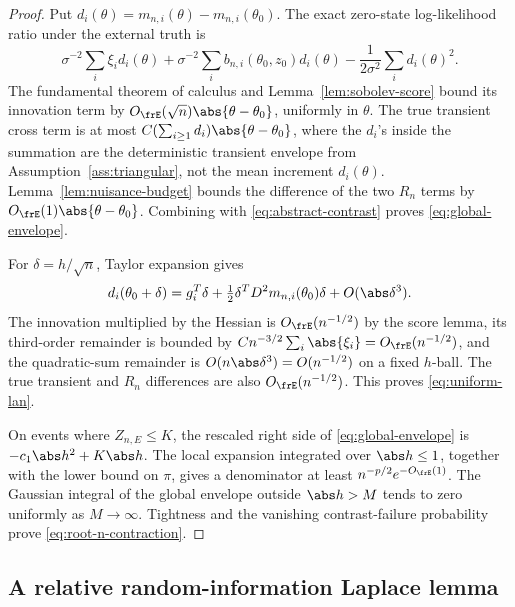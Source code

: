 \begin{proof}
Put \(d_i(\theta)=m_{n,i}(\theta)-m_{n,i}(\theta_0)\).  The exact zero-state
log-likelihood ratio under the external truth is
\begin{equation}
 \sigma^{-2}\sum_i\xi_i d_i(\theta)
 +\sigma^{-2}\sum_i b_{n,i}(\theta_0,z_0)d_i(\theta)
 -\frac1{2\sigma^2}\sum_i d_i(\theta)^2.
 \label{eq:exact-zero-state-ratio}
\end{equation}
The fundamental theorem of calculus and
Lemma~\ref{lem:sobolev-score} bound its innovation term by
\(O_{\frE}(\sqrt n)\abs{\theta-\theta_0}\), uniformly in \(\theta\).
The true transient cross term is at most
\(C(\sum_{i\ge1}d_i)\abs{\theta-\theta_0}\), where the \(d_i\)'s inside
the summation are the deterministic transient envelope from
Assumption~\ref{ass:triangular}, not the mean increment \(d_i(\theta)\).
Lemma~\ref{lem:nuisance-budget} bounds the difference of the two \(R_n\)
terms by \(O_{\frE}(1)\abs{\theta-\theta_0}\). Combining with
\eqref{eq:abstract-contrast} proves \eqref{eq:global-envelope}.

For \(\delta=h/\sqrt n\), Taylor expansion gives
\[
 d_i(\theta_0+\delta)=g_i^T\delta
 +\tfrac12\delta^TD^2m_{n,i}(\theta_0)\delta+O(\abs\delta^3).
\]
The innovation multiplied by the Hessian is \(O_{\frE}(n^{-1/2})\) by the
score lemma, its third-order remainder is bounded by
\(Cn^{-3/2}\sum_i\abs{\xi_i}=O_{\frE}(n^{-1/2})\), and the quadratic-sum
remainder is \(O(n\abs\delta^3)=O(n^{-1/2})\) on a fixed \(h\)-ball. The
true transient and \(R_n\) differences are also \(O_{\frE}(n^{-1/2})\).
This proves \eqref{eq:uniform-lan}.

On events where \(Z_{n,E}\le K\), the rescaled right side of
\eqref{eq:global-envelope} is \(-c_1\abs h^2+K\abs h\). The local expansion
integrated over \(\abs h\le1\), together with the lower bound on \(\pi\),
gives a denominator at least \(n^{-p/2}e^{-O_{\frE}(1)}\). The Gaussian
integral of the global envelope outside \(\abs h>M\) tends to zero
uniformly as \(M\to\infty\). Tightness and the vanishing
contrast-failure probability prove \eqref{eq:root-n-contraction}.
\end{proof}

\subsection{A relative random-information Laplace lemma}

